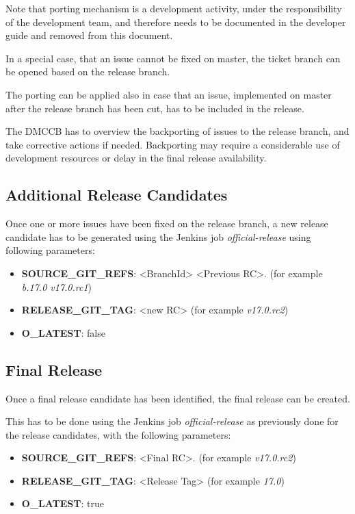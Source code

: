 Note that porting mechanism is a development activity, under the responsibility of the development team, and therefore needs to be documented in the developer guide and removed from this document.

In a special case, that an issue cannot be fixed on master, the ticket branch can be opened based on the release branch.

The porting can be applied also in case that an issue, implemented on master after the release branch has been cut, has to be included in the release.

The DMCCB has to overview the backporting of issues to the release branch, and take corrective actions if needed. Backporting may require a considerable use of development resources or delay in the final release availability.


\subsection{Additional Release Candidates} \label{sect:newrc}

Once one or more issues have been fixed on the release branch, a new release candidate has to be generated using the Jenkins job \textit{official-release} using following parameters:

\begin{itemize}
\item {\bf SOURCE\_GIT\_REFS}: <BranchId> <Previous RC>. (for example \textit{b.17.0 v17.0.rc1})
\item {\bf RELEASE\_GIT\_TAG}: <new RC> (for example \textit{v17.0.rc2})
\item {\bf O\_LATEST}: false
\end{itemize}

\subsection{Final Release} \label{sect:finalrelease}

Once a final release candidate has been identified, the final release can be created.

This has to be done using the Jenkins job \textit{official-release} as previously done for the release candidates, with the following parameters:

\begin{itemize}
\item {\bf SOURCE\_GIT\_REFS}: <Final RC>. (for example \textit{v17.0.rc2})
\item {\bf RELEASE\_GIT\_TAG}: <Release Tag> (for example \textit{17.0})
\item {\bf O\_LATEST}: true
\end{itemize}

